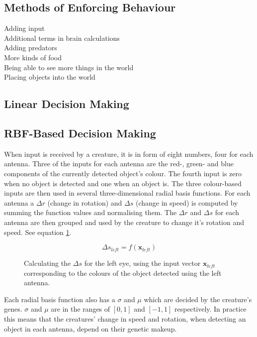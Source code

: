 \documentclass[a4paper,11pt]{kth-mag}
\begin{document}
\subsection{Methods of Enforcing Behaviour}
Adding input\\
Additional terms in brain calculations\\
Adding predators\\
More kinds of food\\
Being able to see more things in the world\\
Placing objects into the world\\
\subsection{Linear Decision Making}
\subsection{RBF-Based Decision Making}

When input is received by a creature, it is in form of eight numbers, four for each antenna. Three of the inputs for each antenna are the red-, green- and blue components of the currently detected object's colour. The fourth input is zero when no object is detected and one when an object is. The three colour-based inputs are then used in several three-dimensional radial basis functions. For each antenna a $\Delta r$ (change in rotation) and $\Delta s$ (change in speed) is computed by summing the function values and normalising them. The $\Delta r$ and $\Delta s$ for each antenna are then grouped and used by the creature to change it's rotation and speed. See equation \ref{RBF_decide}.

\begin{figure}
\begin{equation}
\Delta s _{left} = f(\mathbf{x} _{left})
\end{equation}
\caption{Calculating the $\Delta s$ for the left eye, using the input vector $\mathbf{x} _{left}$ corresponding to the colours of the object detected using the left antenna.\label{RBF_decide}}
\end{figure}

Each radial basis function also has a $\sigma$ and $\mu$ which are decided by the creature's genes. $\sigma$ and $\mu$ are in the ranges of $[0,1]$ and $[-1,1]$ respectively. In practice this means that the creatures' change in speed and rotation, when detecting an object in each antenna, depend on their genetic makeup.
\end{document}
